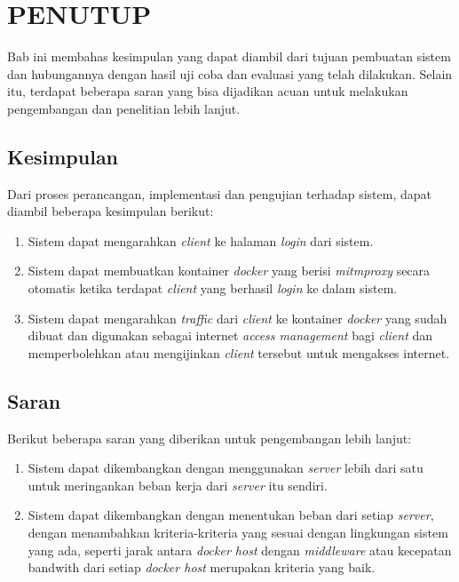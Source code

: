 \chapter{PENUTUP}
    Bab ini membahas kesimpulan yang dapat diambil dari tujuan pembuatan sistem dan hubungannya dengan hasil uji coba dan evaluasi yang telah dilakukan. Selain itu, terdapat beberapa saran yang bisa dijadikan acuan untuk melakukan pengembangan dan penelitian lebih lanjut.
        
\section{Kesimpulan}
Dari proses perancangan, implementasi dan pengujian terhadap sistem, dapat diambil beberapa kesimpulan berikut:
\begin{enumerate}
\item Sistem dapat mengarahkan \textit{client} ke halaman \textit{login} dari sistem.
\item Sistem dapat membuatkan kontainer \textit{docker} yang berisi \textit{mitmproxy} secara otomatis ketika terdapat \textit{client} yang berhasil \textit{login} ke dalam sistem.
\item Sistem dapat mengarahkan \textit{traffic} dari \textit{client} ke kontainer \textit{docker} yang sudah dibuat dan digunakan sebagai internet \textit{access management} bagi \textit{client} dan memperbolehkan atau mengijinkan \textit{client} tersebut untuk mengakses internet. 
\end{enumerate}

\section{Saran}
Berikut beberapa saran yang diberikan untuk pengembangan lebih lanjut:
\begin{enumerate}
\item Sistem dapat dikembangkan dengan menggunakan \textit{server} lebih dari satu untuk meringankan beban kerja dari \textit{server} itu sendiri.
\item Sistem dapat dikembangkan dengan menentukan beban dari setiap \textit{server}, dengan menambahkan kriteria-kriteria yang sesuai dengan lingkungan sistem yang ada, seperti jarak antara \textit{docker host} dengan \textit{middleware} atau kecepatan bandwith dari setiap \textit{docker host} merupakan kriteria yang baik. 
\end{enumerate}